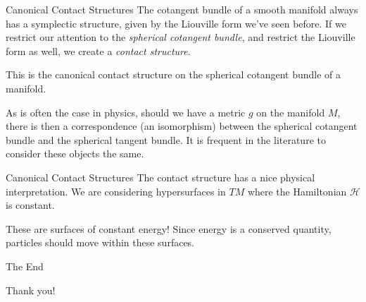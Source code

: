 \documentclass{beamer}
\begin{document}
    \begin{frame}{Canonical Contact Structures}
        The cotangent bundle of a smooth manifold always has a symplectic
        structure, given by the Liouville form we've seen before.
        If we restrict our attention to the \textit{spherical cotangent bundle},
        and restrict the Liouville form as well, we create a
        \textit{contact structure}.
        \par\hfill\par
        This is the canonical contact structure on the spherical cotangent
        bundle of a manifold.
        \par\hfill\par
        As is often the case in physics, should we have a metric $g$ on the
        manifold $M$, there is then a correspondence (an isomorphism) between
        the spherical cotangent bundle and the spherical tangent bundle.
        It is frequent in the literature to consider these objects the same.
    \end{frame}
    \begin{frame}{Canonical Contact Structures}
        The contact structure has a nice physical interpretation. We are
        considering hypersurfaces in $TM$ where the Hamiltonian $\mathcal{H}$
        is constant.
        \par\hfill\par
        These are surfaces of constant energy! Since energy is a conserved
        quantity, particles should move within these surfaces.
    \end{frame}
    \begin{frame}{The End}
        \begin{center}
            Thank you!
        \end{center}
    \end{frame}
\end{document}
